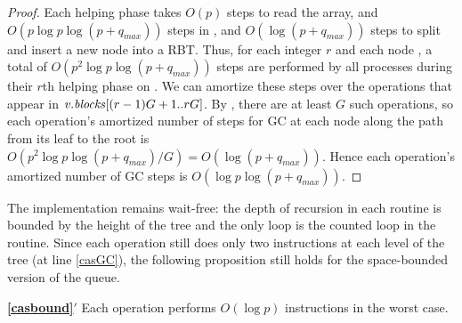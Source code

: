 \begin{proof}
Each helping phase takes $O(p)$ steps to read the  array, and
$O(p \log p \log(p+q_{max}))$ steps in ,
and $O(\log(p+q_{max}))$ steps to split and insert a new node into a RBT.
Thus, for each integer $r$ and each node , a total of $O(p^2\log p\log(p+q_{max}))$ steps
are performed by all processes during their $r$th helping phase on .
We can amortize these steps over the operations that appear in 
$\mbox{\textnormal{\textit{v}}}.\mbox{\textit{blocks}}[(r-1)G+1..rG]$.
By , there are at least $G$ such operations, 
so each operation's amortized number of steps for GC at each node along the path from its leaf to the root
is $O(p^2\log p\log(p+q_{max})/G)=O(\log(p+q_{max}))$.
Hence each operation's amortized number of GC steps is $O(\log p\log(p+q_{max}))$.
\end{proof}

The implementation remains wait-free:  the depth of recursion in each routine is  bounded
by the height of the tree and the only loop is the counted loop in the  routine.
Since each operation still  does only two  instructions at each level of the tree (at line \ref{casGC}), the following proposition still holds for the space-bounded version of the queue.

\begin{customprop}{\bf{\ref{casbound}}$'$}
Each operation performs $O(\log p)$  instructions in the worst case.
\end{customprop}
